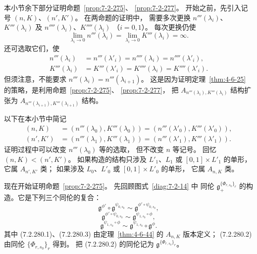 
本小节余下部分证明命题~\ref{prop:7-2-275}、
\ref{prop:7-2-277}。
开始之前，先引入记号 $(n,K)$、$(n',K')$。
在两命题的证明中，
需要多次更换
$n'''(\lambda_i)$、$K'''(\lambda_i)$
及
$n''''(\lambda_i)$、$K''''(\lambda_i)$
（$i=0,1$）。
每次更换仍使
\[
\lim_{\lambda_i\to0}n'''(\lambda_i)
=\lim_{\lambda_i\to0}K'''(\lambda_i)
=\infty.
\]
还可选取它们，使
\[
\begin{aligned}
n'''(\lambda_i)&=n'''(\lambda'_i)
=n''''(\lambda_i)=n''''(\lambda'_i),\\
K'''(\lambda_i)&=K'''(\lambda'_i)
=K''''(\lambda_i)=K''''(\lambda'_i).
\end{aligned}
\]
但须注意，不能要求
$n'''(\lambda_i)=n'''(\lambda_{i+1})$。
这是因为证明定理~\ref{thm:4-6-25}
的策略，是利用命题~\ref{prop:7-2-275}、
\ref{prop:7-2-277}，
把 $A_{n'''(\lambda_i),K'''(\lambda_i)}$
结构扩张为
$A_{n'''(\lambda_{i+1}),K'''(\lambda_{i+1})}$
结构。

以下在本小节中简记
\[
\begin{aligned}
(n,K)
&=(n'''(\lambda_0),K'''(\lambda_0))
 =(n'''(\lambda'_0),K'''(\lambda'_0)),\\
(n',K')
&=(n'''(\lambda_1),K'''(\lambda_1))
 =(n'''(\lambda'_1),K'''(\lambda'_1)).
\end{aligned}
\]
证明过程中可以改变
$n'''(\lambda_0)$ 等的选取，
但不改变 $n$ 等记号。
回忆 $(n,K)<(n',K')$。
如果构造的结构只涉及
$L'_1$、$L_1$ 或
$[0,1]\times L'_1$ 的单形，
它属 $A_{n',K'}$ 类；
如果涉及 $L_0$、$L'_0$
或 $[0,1]\times L'_0$ 的单形，
它属 $A_{n,K}$ 类。

现在开始证明命题~\ref{prop:7-2-275}。
先回顾图式~\ref{diag:7-2-14} 中
同伦 $\mathfrak g_+^{\{\Phi_{r,s_0}\}_r}$
的构造。它是下列三个同伦的复合：
\begin{equation}
\mathfrak g^{\phi'}\circ
\mathfrak g^{\psi_{0,s_0}}
\sim\mathfrak g^{\phi'\circ\psi_{0,s_0}},
\tag{7.2.280.1}\label{eq:7-2-280-1}
\end{equation}
\begin{equation}
\mathfrak g^{\phi'\circ\psi_{0,s_0}}
\sim\mathfrak g^{\psi_{1,s_0}\circ\phi},
\tag{7.2.280.2}\label{eq:7-2-280-2}
\end{equation}
\begin{equation}
\mathfrak g^{\psi_{1,s_0}\circ\phi}
\sim\mathfrak g^{\psi_{1,s_0}}
\circ\mathfrak g^\phi.
\tag{7.2.280.3}\label{eq:7-2-280-3}
\end{equation}
其中 (7.2.280.1)、(7.2.280.3)
由定理~\ref{thm:4-6-44}
的 $A_{n,K}$ 版本定义；
(7.2.280.2) 由同伦
$\{\Phi_{r,s_0}\}_r$ 得到。
把 (7.2.280.2) 的同伦记为
$\mathfrak g^{\{\Phi_{r,s_0}\}_r}$。

